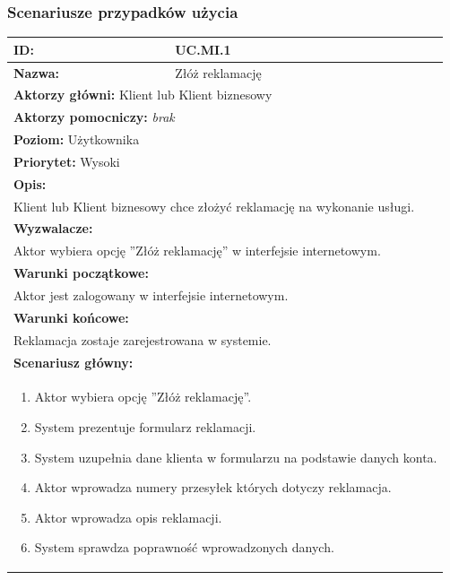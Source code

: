 \subsubsection*{Scenariusze przypadków użycia}
\begin{center}
\begin{longtable}[h]{|p{1.6cm}|p{13.5cm}|}
\hline
\textbf{ID:} & UC.MI.1 \\ \hline
\textbf{Nazwa:} & Złóż reklamację \\ \hline
\multicolumn{2}{|p{15.1cm}|}{\textbf{Aktorzy główni:} Klient lub Klient biznesowy} \\
\multicolumn{2}{|p{15.1cm}|}{\textbf{Aktorzy pomocniczy:}
\textit{brak}} \\
\multicolumn{2}{|p{15.1cm}|}{\textbf{Poziom:} Użytkownika} \\
\multicolumn{2}{|p{15.1cm}|}{\textbf{Priorytet:} Wysoki} \\
\hline
\multicolumn{2}{|p{15.1cm}|}{\textbf{Opis:}} \\
\multicolumn{2}{|p{15.1cm}|}{
Klient lub Klient biznesowy chce złożyć reklamację na wykonanie usługi.
} \\ \hline
\multicolumn{2}{|p{15.1cm}|}{\textbf{Wyzwalacze:}} \\
\multicolumn{2}{|p{15.1cm}|}{
Aktor wybiera opcję ''Złóż reklamację'' w interfejsie internetowym.
} \\ \hline
\multicolumn{2}{|p{15.1cm}|}{\textbf{Warunki początkowe:}} \\
\multicolumn{2}{|p{15.1cm}|}{
Aktor jest zalogowany w interfejsie internetowym.
} \\ \hline
\multicolumn{2}{|p{15.1cm}|}{\textbf{Warunki końcowe:}} \\
\multicolumn{2}{|p{15.1cm}|}{
Reklamacja zostaje zarejestrowana w systemie.
} \\ \hline
\multicolumn{2}{|p{15.1cm}|}{\textbf{Scenariusz główny:}} \\
\multicolumn{2}{|p{15.1cm}|}{
\begin{enumerate}
\item Aktor wybiera opcję ''Złóż reklamację''.
\item System prezentuje formularz reklamacji.
\item System uzupełnia dane klienta w formularzu na podstawie danych konta.
\item Aktor wprowadza numery przesyłek których dotyczy reklamacja.
\item Aktor wprowadza opis reklamacji.
\item System sprawdza poprawność wprowadzonych danych.

\end{enumerate}}
\end{longtable}
\end{center}
